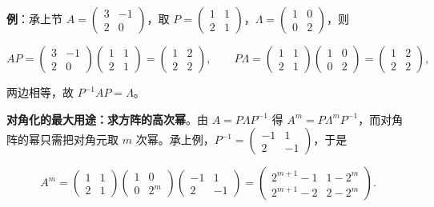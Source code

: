 \documentclass[11pt,openany,UTF8]{ctexbook}
\begin{document}
\textbf{例}：承上节 $A=\begin{pmatrix}3&-1\\2&0\end{pmatrix}$，取 $P=\begin{pmatrix}1&1\\2&1\end{pmatrix}$，$\Lambda=\begin{pmatrix}1&0\\0&2\end{pmatrix}$，则

\[AP=\begin{pmatrix}3&-1\\2&0\end{pmatrix}\begin{pmatrix}1&1\\2&1\end{pmatrix}=\begin{pmatrix}1&2\\2&2\end{pmatrix},\qquad P\Lambda=\begin{pmatrix}1&1\\2&1\end{pmatrix}\begin{pmatrix}1&0\\0&2\end{pmatrix}=\begin{pmatrix}1&2\\2&2\end{pmatrix},\]

两边相等，故 $P^{-1}AP=\Lambda$。

\textbf{对角化的最大用途：求方阵的高次幂}。由 $A=P\Lambda P^{-1}$ 得 $A^m=P\Lambda^mP^{-1}$，而对角阵的幂只需把对角元取 $m$ 次幂。承上例，$P^{-1}=\begin{pmatrix}-1&1\\2&-1\end{pmatrix}$，于是

\[A^m=\begin{pmatrix}1&1\\2&1\end{pmatrix}\begin{pmatrix}1&0\\0&2^m\end{pmatrix}\begin{pmatrix}-1&1\\2&-1\end{pmatrix}=\begin{pmatrix}2^{m+1}-1&1-2^m\\ 2^{m+1}-2&2-2^m\end{pmatrix}.\]
\end{document}
